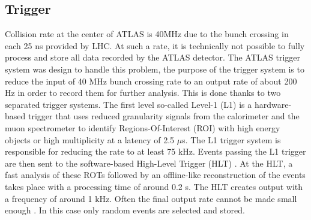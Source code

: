 \subsection{Trigger}
\label{chap2:ATLAS:Trigger}
Collision rate at the center of ATLAS is 40MHz due to the bunch crossing in each 25 ns provided by LHC. At such a rate, it is technically not possible to fully process and store all data recorded by the ATLAS detector. The ATLAS trigger system was design to handle this problem, the purpose of the trigger system is to reduce the input of 40 MHz bunch crossing rate to an output rate of about 200 Hz in order to record them for further analysis. This is done thanks to two separated trigger systems. The first level so-called Level-1 (L1) \cite{Trigger_L1} is a hardware-based trigger that uses reduced granularity signals from the calorimeter and the muon spectrometer to identify Regions-Of-Interest (ROI) with high energy objects or high multiplicity at a latency of 2.5 $\mu$s. The L1 trigger system is responsible for reducing the rate to at least 75 kHz. Events passing the L1 trigger are then sent to the software-based High-Level Trigger (HLT) \cite{Trigger_HLT}. At the HLT, a fast analysis of these ROTs followed by an offline-like reconstruction of the events takes place with a processing time of around 0.2 s. The HLT creates output with a frequency of around 1 kHz. Often the final output rate cannot be made small enough \cite{DQ}. In this case only random events are selected and stored.


